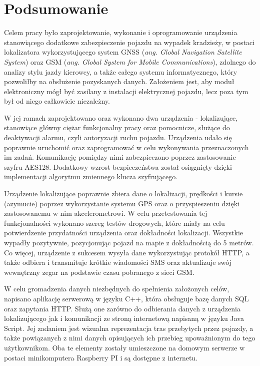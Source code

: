 \chapter{Podsumowanie}
\label{summary}

Celem pracy było zaprojektowanie, wykonanie i oprogramowanie urządzenia stanowiącego dodatkowe zabezpieczenie pojazdu na wypadek kradzieży, w postaci lokalizatora wykorzystującego system GNSS (\textit{ang. Global Navigation Satellite System}) oraz GSM (\textit{ang. Global System for Mobile Communications}), zdolnego do analizy stylu jazdy kierowcy, a także całego systemu informatycznego, który pozwoliłby na obsłużenie pozyskanych danych. Założeniem jest, aby moduł elektroniczny mógł być zasilany z instalacji elektrycznej pojazdu, lecz poza tym był od niego całkowicie niezależny.

W jej ramach zaprojektowano oraz wykonano dwa urządzenia - lokalizujące, stanowiące główny ciężar funkcjonalny pracy oraz pomocnicze, służące do deaktywacji alarmu, czyli autoryzacji ruchu pojazdu. Urządzenia udało się poprawnie uruchomić oraz zaprogramować w celu wykonywania przeznaczonych im zadań. Komunikację pomiędzy nimi zabezpieczono poprzez zastosowanie szyfru AES128. Dodatkowy wzrost bezpieczeństwa został osiągnięty dzięki implementacji algorytmu zmiennego klucza szyfrującego.

Urządzenie lokalizujące poprawnie zbiera dane o lokalizacji, prędkości i kursie (azymucie) poprzez wykorzystanie systemu GPS oraz o przyspieszeniu dzięki zastosowanemu w nim akcelerometrowi. W celu przetestowania tej funkcjonalności wykonano szereg testów drogowych, które miały na celu potwierdzenie przydatności urządzenia oraz dokładności lokalizacji. Wszystkie wypadły pozytywnie, pozycjonując pojazd na mapie z dokładnością do 5 metrów. Co więcej, urządzenie z sukcesem wysyła dane wykorzystując protokół HTTP, a także odbiera i transmituje krótkie wiadomości SMS oraz aktualizuje swój wewnętrzny zegar na podstawie czasu pobranego z sieci GSM.

W celu gromadzenia danych niezbędnych do spełnienia założonych celów, napisano aplikację serwerową w języku C++, która obsługuje bazę danych SQL oraz zapytania HTTP. Służą one zarówno do odbierania danych z urządzenia lokalizującego jak i komunikacji ze stroną internetową napisaną w języku Java Script. Jej zadaniem jest wizualna reprezentacja tras przebytych przez pojazdy, a także powiązanych z nimi danych opisujących ich przebieg upoważnionym do tego użytkownikom. Oba te elementy zostały umieszczone na domowym serwerze w postaci minikomputera Raspberry PI i są dostępne z internetu. 


